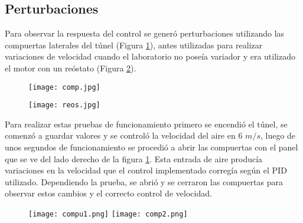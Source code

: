 \subsection{Perturbaciones}
Para observar la respuesta del control se generó perturbaciones utilizando las compuertas laterales del túnel (Figura \ref{fig:comp}), antes utilizadas para realizar variaciones de velocidad\cite{barila1993desarrollo} cuando el laboratorio no poseía variador y era utilizado el motor con un reóstato (Figura \ref{fig:reos}). 

\begin{figure}[H]
	\centering
	\texttt{[image: comp.jpg]}
	\label{fig:comp}
\end{figure}

\begin{figure}[H]
	\centering
	\texttt{[image: reos.jpg]}
	\label{fig:reos}
\end{figure}

Para realizar estas pruebas de funcionamiento primero se encendió el túnel, se comenzó a guardar valores y se controló la velocidad del aire en 6 $m/s$, luego de unos segundos de funcionamiento se procedió a abrir las compuertas con el panel que se ve del lado derecho de la figura \ref{fig:comp}. Esta entrada de aire producía variaciones en la velocidad que el control implementado corregía según el PID utilizado. Dependiendo la prueba, se abrió y se cerraron las compuertas para observar estos cambios y el correcto control de velocidad.


\begin{figure}[H]
	\centering
	\texttt{[image: compu1.png]}
	\label{fig:comp1}
	\texttt{[image: comp2.png]}
	\label{fig:comp2}
\end{figure}




